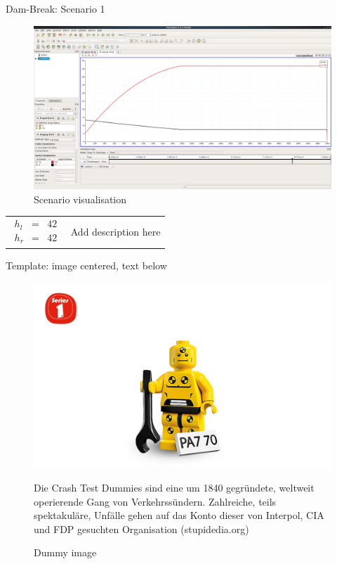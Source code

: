 \documentclass[shortpres]{beamer}
\newcommand{\imgvoffset}{-20pt}
\newcommand{\imgfullscale}{0.75}
\begin{document}
\begin{frame}{Dam-Break: Scenario 1}
	\begin{figure}[t]
		\vspace{\imgvoffset}
		\includegraphics[width=\imgfullscale\linewidth]{img/4_dorf_arrival_as_graph.png}
		\caption*{Scenario visualisation}
	\end{figure}
	
	\begin{tabular}{m{3cm} m{\linewidth-5cm}}
		$
		\begin{matrix}
		h_l & = & 42\\
		h_r & = & 42
		\end{matrix}
		$
		&
		Add description here
	\end{tabular}
\end{frame}


\begin{frame}{Template: image centered, text below}
	\begin{figure}[t]
		\vspace{\imgvoffset}
		\includegraphics[clip, width=\imgfullscale\linewidth]{img/dummy_image.jpg}
		\caption*{Dummy image}
		Die Crash Test Dummies sind eine um 1840 gegründete, weltweit operierende Gang von Verkehrssündern. Zahlreiche, teils spektakuläre, Unfälle gehen auf das Konto dieser von Interpol, CIA und FDP gesuchten Organisation (stupidedia.org)
	\end{figure}
\end{frame}
\end{document}
